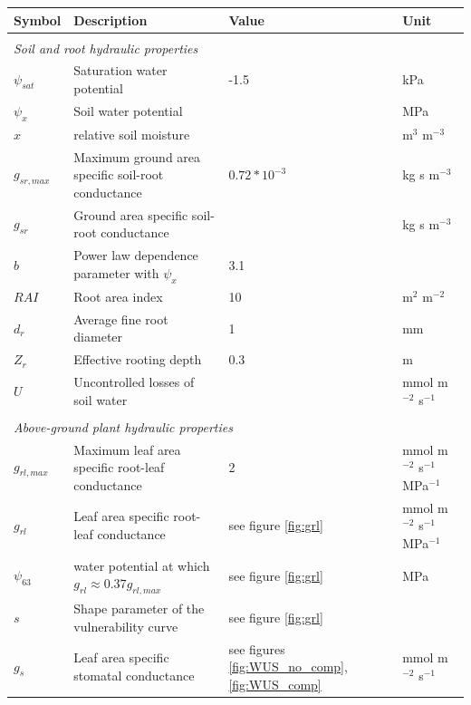 \documentclass[utf8]{frontiersSCNS} %
\begin{document}
\begin{table}[h]
    \centering
    \begin{tabular}{l l l l}
        Symbol & Description & Value & Unit \\
        \hline
        \multicolumn{4}{l}{}\\
        \multicolumn{4}{l}{\textit{Soil and root hydraulic properties}}\\
        \hline
        $\psi_{sat}$ & Saturation water potential & -1.5 & kPa\\
        $\psi_x$ & Soil water potential & & MPa\\
        $x$ & relative soil moisture & & m$^{3}$ m$^{-3}$\\
        $g_{sr,max}$ & Maximum ground area specific soil-root conductance & $0.72 * 10^{-3}$ & kg s m$^{-3}$ \\
        $g_{sr}$ & Ground area specific soil-root conductance & & kg s m$^{-3}$\\
        $b$ & Power law dependence parameter with $\psi_x$ & 3.1 & \\
        $RAI$ & Root area index & 10 & m$^{2}$ m$^{-2}$\\
        $d_r$ & Average fine root diameter & 1 & mm \\
        $Z_r$ & Effective rooting depth & 0.3 & m\\ 
        $U$ & Uncontrolled losses of soil water & & mmol m$^{-2}$ s$^{-1}$\\
        \hline
        \multicolumn{4}{l}{}\\
        \multicolumn{4}{l}{\textit{Above-ground plant hydraulic properties}}\\
        \hline
        $g_{rl,max}$ & Maximum leaf area specific root-leaf conductance & 2 & mmol m$^{-2}$ s$^{-1}$ MPa$^{-1}$ \\
        $g_{rl}$ & Leaf area specific root-leaf conductance & see figure \ref{fig:grl} & mmol m$^{-2}$ s$^{-1}$ MPa$^{-1}$ \\
        $\psi_{63}$ & water potential at which $g_{rl} \approx 0.37 g_{rl,max}$ & see figure \ref{fig:grl} & MPa \\
        $s$ & Shape parameter of the vulnerability curve & see figure \ref{fig:grl} &  \\
        $g_s$ & Leaf area specific stomatal conductance & see figures \ref{fig:WUS_no_comp}, \ref{fig:WUS_comp} & mmol m$^{-2}$ s$^{-1}$ \\

\end{tabular}
\end{table}
\end{document}
